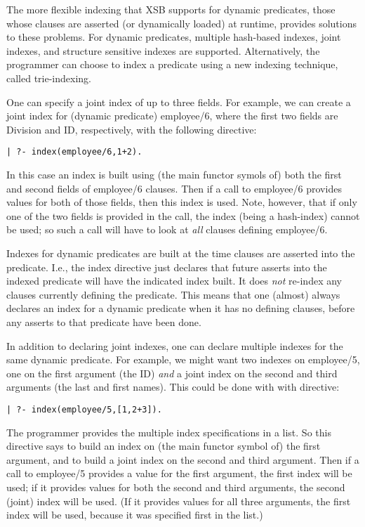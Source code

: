 The more flexible indexing that XSB supports for dynamic predicates,
those whose clauses are asserted (or dynamically loaded) at runtime,
provides solutions to these problems.  For dynamic predicates,
multiple hash-based indexes, joint indexes, and structure sensitive
indexes are supported.  Alternatively, the programmer can choose to
index a predicate using a new indexing technique, called
trie-indexing.

One can specify a joint index of up to three fields.  For example, we
can create a joint index for (dynamic predicate) employee/6, where the
first two fields are Division and ID, respectively, with the following
directive:
\begin{verbatim}
| ?- index(employee/6,1+2).
\end{verbatim}
In this case an index is built using (the main functor symols of) both
the first and second fields of employee/6 clauses.  Then if a call to
employee/6 provides values for both of those fields, then this index
is used.  Note, however, that if only one of the two fields is
provided in the call, the index (being a hash-index) cannot be used;
so such a call will have to look at {\em all} clauses defining
employee/6.

Indexes for dynamic predicates are built at the time clauses are
asserted into the predicate.  I.e., the index directive just declares
that future asserts into the indexed predicate will have the indicated
index built.  It does {\em not} re-index any clauses currently
defining the predicate.  This means that one (almost) always declares
an index for a dynamic predicate when it has no defining clauses,
before any asserts to that predicate have been done.

In addition to declaring joint indexes, one can declare multiple
indexes for the same dynamic predicate.  For example, we might want
two indexes on employee/5, one on the first argument (the ID) {\em
and} a joint index on the second and third arguments (the last and
first names).  This could be done with with directive:
\begin{verbatim}
| ?- index(employee/5,[1,2+3]).
\end{verbatim}
The programmer provides the multiple index specifications in a list.
So this directive says to build an index on (the main functor symbol
of) the first argument, and to build a joint index on the second and
third argument.  Then if a call to employee/5 provides a value for the
first argument, the first index will be used; if it provides values
for both the second and third arguments, the second (joint) index will
be used.  (If it provides values for all three arguments, the first
index will be used, because it was specified first in the list.)

